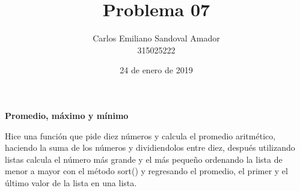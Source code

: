 \documentclass[letterpaper, 12pt, oneside]{article}%
\title{Problema 07}
\author{Carlos Emiliano Sandoval Amador \\ 315025222}
\date{24 de enero de 2019}
\begin{document}
	\maketitle
	\begin{center}
		\textbf{\large Promedio, máximo y mínimo}
	\end{center}
	Hice una función que pide diez números y calcula el promedio aritmético, haciendo la suma de los números y dividiendolos entre diez, después utilizando listas calcula el número más grande y el más pequeño ordenando la lista de menor a mayor con el método sort() y regresando el promedio, el primer y el último valor de la lista en una lista. 
\end{document}
